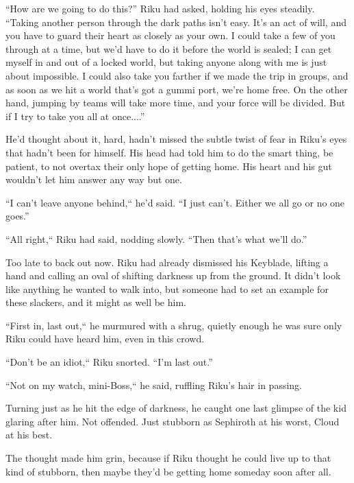 ``How are we going to do this?'' Riku had asked, holding his eyes steadily. ``Taking another person through the dark paths isn't easy. It's an act of will, and you have to guard their heart as closely as your own. I could take a few of you through at a time, but we'd have to do it before the world is sealed; I can get myself in and out of a locked world, but taking anyone along with me is just about impossible. I could also take you farther if we made the trip in groups, and as soon as we hit a world that's got a gummi port, we're home free. On the other hand, jumping by teams will take more time, and your force will be divided. But if I try to take you all at once....''

He'd thought about it, hard, hadn't missed the subtle twist of fear in Riku's eyes that hadn't been for himself. His head had told him to do the smart thing, be patient, to not overtax their only hope of getting home. His heart and his gut wouldn't let him answer any way but one.

``I can't leave anyone behind,`` he'd said. ``I just can't. Either we all go or no one goes.''

``All right,`` Riku had said, nodding slowly. ``Then that's what we'll do.''

Too late to back out now. Riku had already dismissed his Keyblade, lifting a hand and calling an oval of shifting darkness up from the ground. It didn't look like anything he wanted to walk into, but someone had to set an example for these slackers, and it might as well be him.

``First in, last out,`` he murmured with a shrug, quietly enough he was sure only Riku could have heard him, even in this crowd.

``Don't be an idiot,`` Riku snorted. ``I'm last out.''

``Not on my watch, mini-Boss,`` he said, ruffling Riku's hair in passing.

Turning just as he hit the edge of darkness, he caught one last glimpse of the kid glaring after him. Not offended. Just stubborn as Sephiroth at his worst, Cloud at his best.

The thought made him grin, because if Riku thought he could live up to that kind of stubborn, then maybe they'd be getting home someday soon after all.
